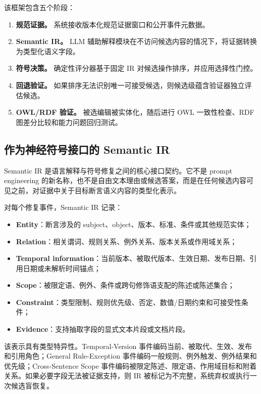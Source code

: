 \documentclass[conference]{IEEEtran}
\begin{document}
该框架包含五个阶段：
\begin{enumerate}
    \item \textbf{规范证据。} 系统接收版本化规范证据窗口和公开事件元数据。
    \item \textbf{Semantic IR。} LLM 辅助解释模块在不访问候选内容的情况下，将证据转换为类型化语义字段。
    \item \textbf{符号决策。} 确定性评分器基于固定 IR 对候选操作排序，并应用选择性门控。
    \item \textbf{回退验证。} 如果排序无法识别唯一可接受候选，则候选级蕴含验证器独立评估候选。
    \item \textbf{OWL/RDF 验证。} 被选编辑被实体化，随后进行 OWL 一致性检查、RDF 图差分比较和能力问题回归测试。
\end{enumerate}

\subsection{作为神经符号接口的 Semantic IR}

Semantic IR 是语言解释与符号修复之间的核心接口契约。它不是 prompt engineering 的新名称，也不是自由文本理由或候选答案，而是在任何候选内容可见之前，对证据中关于目标断言语义内容的类型化表示。

对每个修复事件，Semantic IR 记录：
\begin{itemize}
    \item \textbf{Entity}：断言涉及的 subject、object、版本、标准、条件或其他规范实体；
    \item \textbf{Relation}：相关谓词、规则关系、例外关系、版本关系或作用域关系；
    \item \textbf{Temporal information}：当前版本、被取代版本、生效日期、发布日期、引用日期或未解析时间锚点；
    \item \textbf{Scope}：被限定语、例外、条件或跨句修饰语支配的陈述或陈述集合；
    \item \textbf{Constraint}：类型限制、规则优先级、否定、数值/日期约束和可接受性条件；
    \item \textbf{Evidence}：支持抽取字段的显式文本片段或文档片段。
\end{itemize}

该表示具有类型特异性。Temporal-Version 事件编码当前、被取代、生效、发布和引用角色；General Rule-Exception 事件编码一般规则、例外触发、例外结果和优先级；Cross-Sentence Scope 事件编码被限定陈述、限定语、作用域目标和附着关系。如果必要字段无法被证据支持，则 IR 被标记为不完整，系统弃权或执行一次候选盲恢复。
\end{document}
